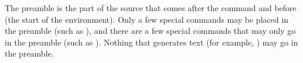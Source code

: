The \gls*{preamble} is the part of the \gls{source} that comes
after the \screenlinebreak\reportlinebreak{}
\gls{command} and before
 (the start of the
 \gls{environment}).  Only
a few
special commands may be placed in the preamble (such as ), and there are a few
special commands that may only go in the preamble (such as ).
Nothing that generates text (for example, ) may go in the preamble.

\preambleillustration

